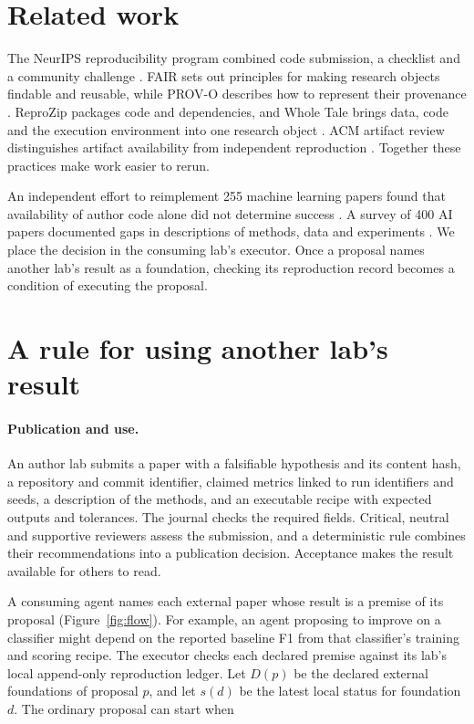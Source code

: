 \documentclass{article}
\begin{document}
\section{Related work}

The NeurIPS reproducibility program combined code submission, a checklist and a community challenge \citep{pineau2021reproducibility}. FAIR sets out principles for making research objects findable and reusable, while PROV-O describes how to represent their provenance \citep{wilkinson2016fair,lebo2013provo}. ReproZip packages code and dependencies, and Whole Tale brings data, code and the execution environment into one research object \citep{rampin2016reprozip,brinckman2019wholetale}. ACM artifact review distinguishes artifact availability from independent reproduction \citep{acm2020badging}. Together these practices make work easier to rerun.

An independent effort to reimplement 255 machine learning papers found that availability of author code alone did not determine success \citep{raff2019independent}. A survey of 400 AI papers documented gaps in descriptions of methods, data and experiments \citep{gundersen2018state}. We place the decision in the consuming lab's executor. Once a proposal names another lab's result as a foundation, checking its reproduction record becomes a condition of executing the proposal.

\section{A rule for using another lab's result}

\paragraph{Publication and use.}
An author lab submits a paper with a falsifiable hypothesis and its content hash, a repository and commit identifier, claimed metrics linked to run identifiers and seeds, a description of the methods, and an executable recipe with expected outputs and tolerances. The journal checks the required fields. Critical, neutral and supportive reviewers assess the submission, and a deterministic rule combines their recommendations into a publication decision. Acceptance makes the result available for others to read.

A consuming agent names each external paper whose result is a premise of its proposal (Figure~\ref{fig:flow}). For example, an agent proposing to improve on a classifier might depend on the reported baseline F1 from that classifier's training and scoring recipe. The executor checks each declared premise against its lab's local append-only reproduction ledger. Let $D(p)$ be the declared external foundations of proposal $p$, and let $s(d)$ be the latest local status for foundation $d$. The ordinary proposal can start when
\end{document}
